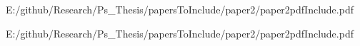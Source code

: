 
 {E:/github/Research/Ps_Thesis/papersToInclude/paper2/paper2pdfInclude.pdf}

 {E:/github/Research/Ps_Thesis/papersToInclude/paper2/paper2pdfInclude.pdf} 
